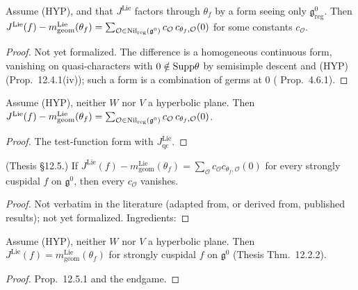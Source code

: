 \begin{lemma}
\label{prop_11_8_1_of_jqc}
\leanok
{}
Assume (HYP), and that $J^{\mathrm{Lie}}$ factors through $\theta_f$ by a form seeing only $\mathfrak g^0_{\mathrm{reg}}$.
Then $J^{\mathrm{Lie}}(f)-m^{\mathrm{Lie}}_{\mathrm{geom}}(\theta_f)=\sum_{\mathcal O\in\mathrm{Nil}_{\mathrm{reg}}(\mathfrak g^0)}c_{\mathcal O}\,c_{\theta_f,\mathcal O}(0)$
for some constants $c_{\mathcal O}$.
\end{lemma}
\begin{proof}
Not yet formalized. The difference is a homogeneous continuous form, vanishing on quasi-characters with
$0\notin\mathrm{Supp}\theta$ by semisimple descent and (HYP) (Prop.~12.4.1(iv)); such a form is a combination of germs at
$0$ (\cite{BP} Prop.~4.6.1).
\end{proof}

\begin{proposition}
\label{prop_11_8_1}
\leanok
{}
Assume (HYP), neither $W$ nor $V$ a hyperbolic plane. Then
$J^{\mathrm{Lie}}(f)-m^{\mathrm{Lie}}_{\mathrm{geom}}(\theta_f)=\sum_{\mathcal O\in\mathrm{Nil}_{\mathrm{reg}}(\mathfrak g^0)}c_{\mathcal O}\,c_{\theta_f,\mathcal O}(0)$.
\end{proposition}
\begin{proof}
\leanok
{}
The test-function form with $J^{\mathrm{Lie}}_{\mathrm{qc}}$.
\end{proof}

\begin{theorem}
\label{lie_endgame}
\leanok
{}
(Thesis \S12.5.) If $J^{\mathrm{Lie}}(f)-m^{\mathrm{Lie}}_{\mathrm{geom}}(\theta_f)=\sum_{\mathcal O}c_{\mathcal O}c_{\theta_f,\mathcal O}(0)$
for every strongly cuspidal $f$ on $\mathfrak g^0$, then every $c_{\mathcal O}$ vanishes.
\end{theorem}
\begin{proof}
Not verbatim in the literature (adapted from, or derived from, published results); not yet formalized. Ingredients: 
\end{proof}

\begin{theorem}[$J^{\mathrm{Lie}}=J^{\mathrm{Lie}}_{\mathrm{geom}}$]
\label{distribJLie_eq_mGeomLie}
\leanok
{}
Assume (HYP), neither $W$ nor $V$ a hyperbolic plane. Then $J^{\mathrm{Lie}}(f)=m^{\mathrm{Lie}}_{\mathrm{geom}}(\theta_f)$
for strongly cuspidal $f$ on $\mathfrak g^0$ (Thesis Thm.~12.2.2).
\end{theorem}
\begin{proof}
\leanok
{}
Prop.~12.5.1 and the endgame.
\end{proof}

